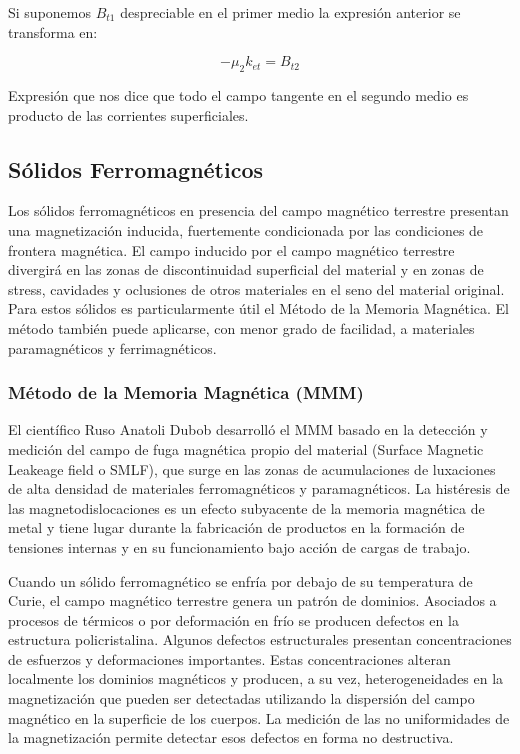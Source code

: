 Si suponemos $B_{t1}$ despreciable en el primer medio la expresión anterior se transforma en:

\begin{equation}
	\label{eq:53}
	 - \mu_{2} k_{et} = B_{t2}
\end{equation}

Expresión que nos dice que todo el campo tangente en el segundo medio es producto de las corrientes superficiales.

\subsection{Sólidos Ferromagnéticos}

Los sólidos ferromagnéticos en presencia del campo magnético terrestre presentan una magnetización inducida, fuertemente condicionada por las condiciones de frontera magnética. El campo inducido por el campo magnético terrestre divergirá en las zonas de discontinuidad superficial del material y en zonas de stress, cavidades y oclusiones de otros materiales en el seno del material original. Para estos sólidos es particularmente útil el Método de la Memoria Magnética. El método también puede aplicarse, con menor grado de facilidad, a materiales paramagnéticos y ferrimagnéticos.

\subsubsection{Método de la Memoria Magnética (MMM)}

El científico Ruso Anatoli Dubob desarrolló el MMM basado en la detección y medición del campo de fuga magnética propio del material (Surface Magnetic Leakeage field o SMLF), que surge en las zonas de acumulaciones de luxaciones de alta densidad de materiales ferromagnéticos y paramagnéticos. La histéresis de las magnetodislocaciones es un efecto subyacente de la memoria magnética de metal y tiene lugar durante la fabricación de productos en la formación de tensiones internas y en su funcionamiento bajo acción de cargas de trabajo. 

Cuando un sólido ferromagnético se enfría por debajo de su temperatura de Curie, el campo magnético terrestre genera un patrón de dominios. Asociados a procesos de térmicos o por deformación en frío se producen defectos en la estructura policristalina. Algunos defectos estructurales presentan concentraciones de esfuerzos y deformaciones importantes. Estas concentraciones alteran localmente los dominios magnéticos y producen, a su vez, heterogeneidades en la magnetización que pueden ser detectadas utilizando la dispersión del campo magnético en la superficie de los cuerpos. La medición de las no uniformidades de la magnetización permite detectar esos defectos en forma no destructiva. 

